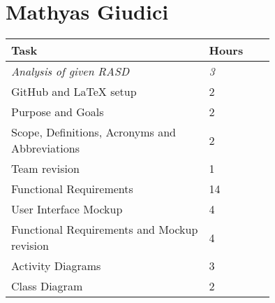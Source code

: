 \section{Mathyas Giudici}

\smallskip
\begin{center}
\begin{tabular}{ | p{0.75\linewidth} | l | }
  \hline
    \textbf{Task} & \textbf{Hours }\\ \hline
    \textit{Analysis of given RASD} & \textit{3} \\ \hline
    GitHub and LaTeX setup & 2 \\ \hline
    Purpose and Goals & 2 \\ \hline
    Scope, Definitions, Acronyms and Abbreviations & 2 \\ \hline
    Team revision & 1 \\ \hline
    Functional Requirements & 14 \\ \hline
    User Interface Mockup & 4 \\ \hline
    Functional Requirements and Mockup revision & 4 \\ \hline
    Activity Diagrams & 3 \\ \hline
    Class Diagram & 2 \\ \hline
\end{tabular}
\end{center}

\clearpage
